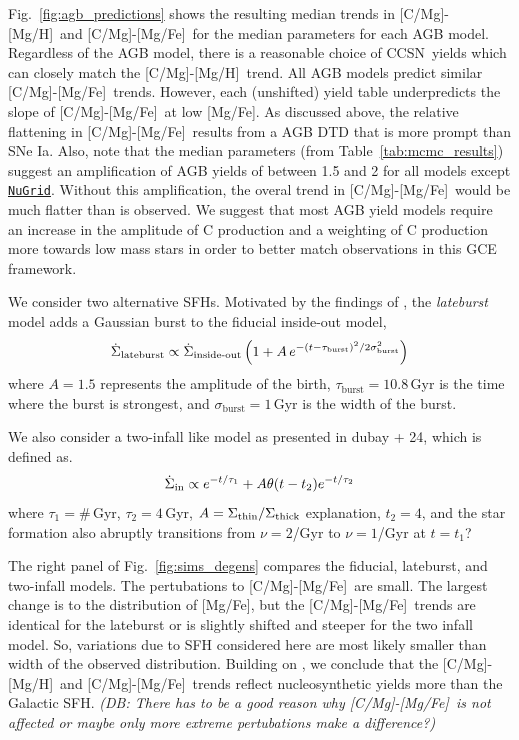 \documentclass[fleqn,
usenatbib]{mnras}
\newcommand{\JJ}{\citetalias{james+21}}
\newcommand{\nugrid}{\texttt{\hyperlink{nugrid}{NuGrid}}}
\newcommand{\cc}{CCSN}
\newcommand{\caah}{[C/Mg]-[Mg/H]}
\newcommand{\caafe}{[C/Mg]-[Mg/Fe]}
\newcommand{\dbadd}[1]{{\color{Thistle} #1}}
\newcommand{\dbnote}[1]{ {\color{Thistle} \textit{\small (DB: #1)}} }
\begin{document}
Fig.~\ref{fig:agb_predictions} shows the resulting median trends in \caah\ and \caafe\ for the median parameters for each AGB model. Regardless of the AGB model, there is a reasonable choice of \cc\ yields which can closely match the \caah\ trend. All AGB models predict similar \caafe\ trends. However, each (unshifted) yield table underpredicts the slope of \caafe\ at low [Mg/Fe]. As discussed above, the relative flattening in \caafe\ results from a AGB DTD that is more prompt than SNe Ia.
Also, note that the median parameters (from Table~\ref{tab:mcmc_results}) suggest an amplification of AGB yields of between 1.5 and 2 for all models except \nugrid. Without this amplification, the overal trend in \caafe\ would be much flatter than is observed. 
We suggest that most AGB yield models require an increase in the amplitude of C production and a weighting of C production more towards low mass stars in order to better match observations in this GCE framework.


We consider two alternative SFHs. 
Motivated by the findings of \citet[see discussion in \JJ]{mor+19,isern19}, the \textit{lateburst} model
adds a Gaussian burst to the fiducial inside-out model, 
\begin{equation}\label{eq:lateburst}
    \dot{\Sigma}_\text{lateburst} \propto \dot{\Sigma}_\text{inside-out} \left(1 + A\,e^{-(t-\tau_{\rm burst})^2/2\sigma^2_{\rm burst}} \right)
\end{equation}
where $A=1.5$ represents the amplitude of the birth, $\tau_\text{burst}=10.8$\,Gyr is the time where the burst is strongest, and $\sigma_\text{burst}=1$\,Gyr is the width of the burst.

We also consider a two-infall like model as presented in \dbadd{dubay + 24}, which is defined as.
\begin{equation}\label{twoinfall}
\dot{\Sigma}_{\rm in} \propto e^{-t/\tau_1} + A \theta(t - t_{2}) e^{-t/\tau_2}
\end{equation}
where $\tau_1=\#\,$Gyr, $\tau_2=4\,$Gyr, $A=\Sigma_{\rm thin} / \Sigma_{\rm thick}$ \dbadd{explanation}, $t_2=4$, and the star formation also abruptly transitions from $\nu=2$/Gyr to $\nu=1$/Gyr at $t=t_1$?

The right panel of Fig.~\ref{fig:sims_degens} compares the fiducial, lateburst, and two-infall models. The pertubations to \caafe\ are small. The largest change is to the distribution of [Mg/Fe], but the \caafe\ trends are identical for the lateburst or is slightly shifted and steeper for the two infall model. So, variations due to SFH considered here are most likely smaller than width of the observed distribution.
Building on \citet{james+23}, we conclude that the \caah\ and \caafe\ trends reflect nucleosynthetic yields more than the Galactic SFH. 
\dbnote{There has to be a good reason why \caafe\ is not affected or maybe only more extreme pertubations make a difference?}
\end{document}
